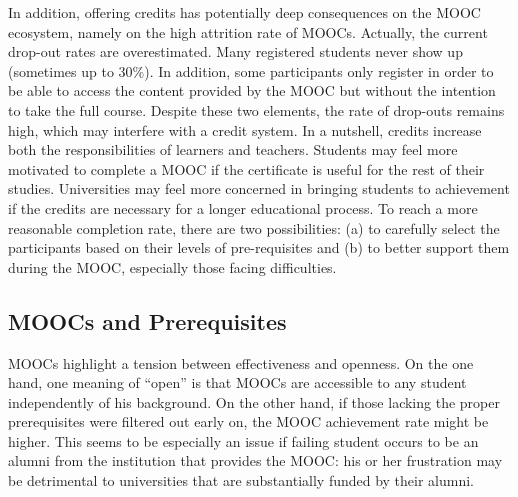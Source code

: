 In addition, offering credits has potentially deep consequences on the MOOC
ecosystem, namely on the high attrition rate of MOOCs. Actually, the
current drop-out rates are overestimated. Many registered students never
show up (sometimes up to 30\%). In addition, some participants only
register in order to be able to access the content provided by the MOOC
but without the intention to take the full course. Despite these two
elements, the rate of drop-outs remains high, which may interfere with a
credit system. In a nutshell, credits increase both the responsibilities
of learners and teachers. Students may feel more motivated to complete a
MOOC if the certificate is useful for the rest of their
studies. Universities may feel more concerned in bringing students to
achievement if the credits are necessary for a longer educational
process.  To reach a more reasonable completion rate, there are two
possibilities: (a) to carefully select the participants based on their
levels of pre-requisites and (b) to better support them during the MOOC,
especially those facing difficulties. 


\subsection{MOOCs and Prerequisites}

MOOCs highlight a tension between effectiveness and openness. 
On the one hand, one meaning of  ``open''  is that MOOCs are accessible to any
student independently of his background.  On the other hand,
if those lacking the proper prerequisites were filtered
out early on, the MOOC achievement rate might be higher. This seems to be especially
an issue if failing student occurs to be an alumni from the institution that provides the
MOOC: his or her frustration may be detrimental to
universities that are substantially funded by their alumni.

